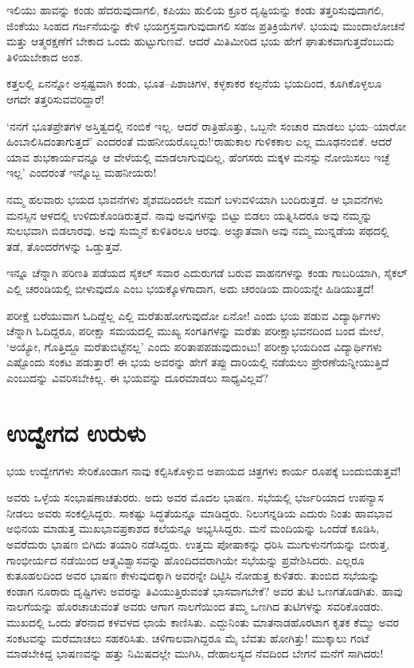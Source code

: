 ಇಲಿಯು ಹಾವನ್ನು ಕಂಡು ಹೆದರುವುದಾಗಲಿ, ಕಪಿಯು ಹುಲಿಯ ಕ್ರೂರ ದೃಷ್ಟಿಯನ್ನು ಕಂಡು ತತ್ತರಿಸುವುದಾಗಲಿ, ಜಿಂಕೆಯು ಸಿಂಹದ ಗರ್ಜನೆಯನ್ನು ಕೇಳಿ ಭಯಗ್ರಸ್ತವಾಗುವುದಾಗಲಿ ಸಹಜ ಪ್ರತಿಕ್ರಿಯೆಗಳೆ. ಭಯವು ಮುಂದಾಲೋಚನೆ ಮತ್ತು ಆತ್ಮರಕ್ಷಣೆಗೆ ಬೇಕಾದ ಒಂದು ಹುಟ್ಟುಗುಣವೆ. ಆದರೆ ಮಿತಿಮೀರಿದ ಭಯ ಹೇಗೆ ಘಾತುಕವಾಗುತ್ತದೆಂಬುದು ತಿಳಿಯಬೇಕಾದ ಅಂಶ.

ಕತ್ತಲಲ್ಲಿ ಏನನ್ನೋ ಅಸ್ಪಷ್ಟವಾಗಿ ಕಂಡು, ಭೂತ–ಪಿಶಾಚಿಗಳ, ಕಳ್ಳಕಾಕರ ಕಲ್ಪನೆಯ ಭಯದಿಂದ, ಕೂಗಿಕೊಳ್ಳಲೂ ಆಗದೇ ತತ್ತರಿಸುವವರಿದ್ದಾರೆ!

‘ನನಗೆ ಭೂತಪ್ರೇತಗಳ ಅಸ್ತಿತ್ವದಲ್ಲಿ ನಂಬಿಕೆ ಇಲ್ಲ. ಆದರೆ ರಾತ್ರಿಹೊತ್ತು, ಒಬ್ಬನೇ ಸಂಚಾರ ಮಾಡಲು ಭಯ–ಯಾರೋ ಹಿಂಬಾಲಿಸಿದಂತಾಗುತ್ತದೆ’ ಎಂದರಂತೆ ಮಹನೀಯರೊಬ್ಬರು!\break ‘ರಾಹುಕಾಲ ಗುಳಿಕಕಾಲ ಎಲ್ಲ ಮೂಢನಂಬಿಕೆ. ಆದರೆ ಯಾವ ಶುಭಕಾರ್ಯವನ್ನೂ ಆ ವೇಳೆಯಲ್ಲಿ ಮಾಡಲಾಗುವುದಿಲ್ಲ, ಹೆಂಗಸರು ಮಕ್ಕಳ ಮನಸ್ಸು ನೋಯಿಸಲು ಇಚ್ಛೆ ಇಲ್ಲ’ ಎಂದರಂತೆ ಇನ್ನೊಬ್ಬ ಮಹನೀಯರು!

\newpage

ನಮ್ಮ ಹಲವಾರು ಭಯದ ಭಾವನೆಗಳು ಶೈಶವದಿಂದಲೇ ನಮಗೆ ಬಳುವಳಿಯಾಗಿ ಬಂದಿರುತ್ತದೆ. ಆ ಭಾವನೆಗಳು ಮನಸ್ಸಿನ ಆಳದಲ್ಲಿ ಉಳಿದುಕೊಂಡಿರುತ್ತವೆ. ನಾವು ಅವುಗಳನ್ನು ಬಿಟ್ಟು ಬಿಡಲು ಯತ್ನಿಸಿದರೂ ಅವು ನಮ್ಮನ್ನು ಸುಲಭವಾಗಿ ಬಿಡಲಾರವು. ಅವು ಸುಮ್ಮನೆ ಕುಳಿತಿರಲೂ ಆರವು. ಅಜ್ಞಾತವಾಗಿ ಅವು ನಮ್ಮ ಮುನ್ನಡೆಯ ಪಥದಲ್ಲಿ ತಡೆ, ತೊಂದರೆಗಳನ್ನು ಒಡ್ಡುತ್ತವೆ.

\vskip 3pt

ಇನ್ನೂ ಚೆನ್ನಾಗಿ ಪರಿಣತಿ ಪಡೆಯದ ಸೈಕಲ್ ಸವಾರ ಎದುರುಗಡೆ ಬರುವ ವಾಹನಗಳನ್ನು ಕಂಡು ಗಾಬರಿಯಾಗಿ, ಸೈಕಲ್ ಎಲ್ಲಿ ಚರಂಡಿಯಲ್ಲಿ ಬೀಳುವುದೊ ಎಂಬ ಭಯಕ್ಕೊಳಗಾದಾಗ, ಅದು ಚರಂಡಿಯ ದಾರಿಯನ್ನೇ ಹಿಡಿಯುತ್ತದೆ!

\vskip 3pt

ಪರೀಕ್ಷೆ ಬರೆಯುವಾಗ ಓದಿದ್ದೆಲ್ಲ ಎಲ್ಲಿ ಮರೆತುಹೋಗುವುದೋ ಏನೋ! ಎಂದು ಭಯ ಪಡುವ ವಿದ್ಯಾರ್ಥಿಗಳು ಚೆನ್ನಾಗಿ ಓದಿದ್ದರೂ, ಪರೀಕ್ಷಾ ಸಮಯದಲ್ಲಿ ಮುಖ್ಯ ಸಂಗತಿಗಳನ್ನು ಮರೆತು ಪರೀಕ್ಷಾಭವನದಿಂದ ಬಂದ ಮೇಲೆ, ‘ಅಯ್ಯೋ, ಗೊತ್ತಿದ್ದೂ ಮರೆತುಬಿಟ್ಟೆನಲ್ಲ’ ಎಂದು ಪರಿತಾಪಪಡುವುದುಂಟು! ಪರೀಕ್ಷಾಭಯದಿಂದ ವಿದ್ಯಾರ್ಥಿಗಳು ಎಷ್ಟೊಂದು ಸಂಕಟ ಪಡುತ್ತಾರೆ! ಈ ಭಯ ಅವರನ್ನು ಹೇಗೆ ತಪ್ಪು ದಾರಿಯಲ್ಲಿ ನಡೆಯಲು ಪ್ರೇರಣೆಯನ್ನೀಯುತ್ತಿದೆ ಎಂಬುದನ್ನು ವಿವರಿಸಬೇಕಿಲ್ಲ. ಈ ಭಯವನ್ನು ದೂರಮಾಡಲು ಸಾಧ್ಯವಿಲ್ಲವೆ?


\section*{ಉದ್ವೇಗದ ಉರುಳು}


ಭಯ ಉದ್ವೇಗಗಳು ಸೇರಿಕೊಂಡಾಗ ನಾವು ಕಲ್ಪಿಸಿಕೊಳ್ಳುವ ಅಪಾಯದ ಚಿತ್ರಗಳು ಕಾರ್ಯ ರೂಪಕ್ಕೆ ಬಂದುಬಿಡುತ್ತವೆ!

\vskip 3pt

ಅವರು ಒಳ್ಳೆಯ ಸಂಭಾಷಣಾಚತುರರು. ಅದು ಅವರ ಮೊದಲ ಭಾಷಣ. ಸಭೆಯಲ್ಲಿ ಭರ್ಜರಿಯಾದ ಉಪನ್ಯಾಸ ನೀಡಲು ಅವರು ಸಂಕಲ್ಪಿಸಿದ್ದರು. ಸಾಕಷ್ಟು ಸಿದ್ಧತೆಯನ್ನೂ ಮಾಡಿದ್ದರು. ನಿಲುಗನ್ನಡಿಯ ಎದುರು ನಿಂತು ಹಾವಭಾವ ಅಭಿನಯ ಮಾಡುತ್ತ ಮುಖ\-ಭಾವ\-ಪ್ರಕಾಶದ ಕಲೆಯನ್ನೂ ಅಭ್ಯಸಿಸಿದ್ದರು. ಮನೆ ಮಂದಿಯನ್ನು ಒಂದೆಡೆ ಕೂಡಿಸಿ, ಅವರೆದುರು ಭಾಷಣ ಬಿಗಿದು ತಯಾರಿ ನಡೆಸಿದ್ದರು. ಉತ್ತಮ ಪೋಷಾಕನ್ನು ಧರಿಸಿ ಮುಗುಳುನಗೆಯನ್ನು ಬೀರುತ್ತ, ಗಾಂಭೀರ್ಯದ ನಡೆಯಿಂದ ಆತ್ಮವಿಶ್ವಾಸವನ್ನು ಹೊಂದಿದವರಾಗಿಯೇ ಸಭೆಯನ್ನು ಪ್ರವೇಶಿಸಿದರು. ಎಲ್ಲರೂ ಕುತೂಹಲದಿಂದ ಅವರ ಭಾಷಣ ಕೇಳುವುದಕ್ಕಾಗಿ ಅವರನ್ನೇ ದಿಟ್ಟಿಸಿ ನೋಡುತ್ತ ಕುಳಿತರು. ತುಂಬಿದ ಸಭೆಯನ್ನು ಕಂಡಾಗ ನೂರಾರು ದೃಷ್ಟಿಗಳು ಅವರನ್ನು ತಿವಿಯುತ್ತಿರುವಂತೆ ಭಾಸವಾಗಬೇಕೆ? ಅವರ ತುಟಿ ಒಣಗತೊಡಗಿತು. ಹಾವು ನಾಲಗೆಯನ್ನು ಹೊರಚಾಚುವಂತೆ ಅವರು ಆಗಾಗ ನಾಲಗೆಯಿಂದ ತಮ್ಮ ಒಣಗಿದ ತುಟಿಗಳನ್ನು ಸವರಿಕೊಂಡರು. ಮುಖದಲ್ಲಿ ಒಂದು ತೆರನಾದ ಕಳವಳದ ಛಾಯೆ ಕಾಣಿಸಿತು. ಎದ್ದುನಿಂತು ಮಾತನಾಡಹೊರಟಾಗ ಕೃತಕ ಕೆಮ್ಮು ಅವರ ಸಂಕಟವನ್ನು ಮರೆಮಾಚಲು ಸಹಕರಿಸಿತು. ಚಳಿಗಾಲವಾಗಿದ್ದರೂ ಮೈ ಬೆವತು ಹೋಗಿತ್ತು! ಮುಕ್ಕಾಲು ಗಂಟೆ ಮಾಡಬೇಕಿದ್ದ ಭಾಷಣವನ್ನು ಹತ್ತು ನಿಮಿಷದಲ್ಲೇ ಮುಗಿಸಿ, ದೇಹಾಲಸ್ಯದ ನೆವದಿಂದ ಬೇಗನೆ ಮನೆಗೆ ಸಾಗಿದರು!

